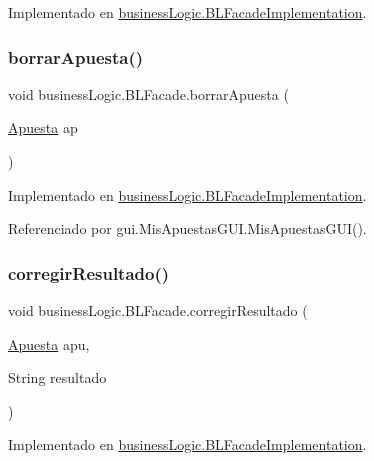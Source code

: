 Implementado en \mbox{\hyperlink{classbusinessLogic_1_1BLFacadeImplementation_a1da1d7f11768f7f37c395c534a19323b}{business\+Logic.\+B\+L\+Facade\+Implementation}}.

\mbox{\label{interfacebusinessLogic_1_1BLFacade_ab30f9458b5169fda3e5bead92dcf3f84}} 
\subsubsection{\texorpdfstring{borrarApuesta()}{borrarApuesta()}}
{\footnotesize\ttfamily void business\+Logic.\+B\+L\+Facade.\+borrar\+Apuesta (\begin{DoxyParamCaption}\item[{\mbox{\hyperlink{classdomain_1_1Apuesta}{Apuesta}}}]{ap }\end{DoxyParamCaption})}



Implementado en \mbox{\hyperlink{classbusinessLogic_1_1BLFacadeImplementation_a3abfaef4d8952fca7a22d4b346fb155a}{business\+Logic.\+B\+L\+Facade\+Implementation}}.



Referenciado por gui.\+Mis\+Apuestas\+G\+U\+I.\+Mis\+Apuestas\+G\+U\+I().

\mbox{\label{interfacebusinessLogic_1_1BLFacade_ac643520df65287794056938207db059f}} 
\subsubsection{\texorpdfstring{corregirResultado()}{corregirResultado()}}
{\footnotesize\ttfamily void business\+Logic.\+B\+L\+Facade.\+corregir\+Resultado (\begin{DoxyParamCaption}\item[{\mbox{\hyperlink{classdomain_1_1Apuesta}{Apuesta}}}]{apu,  }\item[{String}]{resultado }\end{DoxyParamCaption})}



Implementado en \mbox{\hyperlink{classbusinessLogic_1_1BLFacadeImplementation_a46e307bd8d9e04795bd15b815220d782}{business\+Logic.\+B\+L\+Facade\+Implementation}}.



